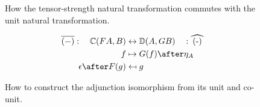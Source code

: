 \begin{figure}
        \vspace{2em}
    
        \begin{minipage}[t]{0.45\linewidth}
            \begin{framed}
            \end{framed}
            \caption{How the tensor-strength natural transformation commutes with the unit natural transformation.}
            \label{TensorStrengthPoint}
        \end{minipage}
        \quad
        \begin{minipage}[t]{0.45\linewidth}
            \begin{framed}
                \begin{align*}
                    \bar{(-)}: \quad\C(FA, B) &\leftrightarrow \DC(A, GB)   \quad: \widehat{(-)}\\
                    f & \mapsto G(f)\after\eta_A \\
                    \epsilon\after F(g) & \mapsfrom g
                \end{align*}
            \end{framed}
            \caption{How to construct the adjunction isomorphism from its unit and co-unit.}
            \label{Adjunction}
        \end{minipage}
\end{figure}



